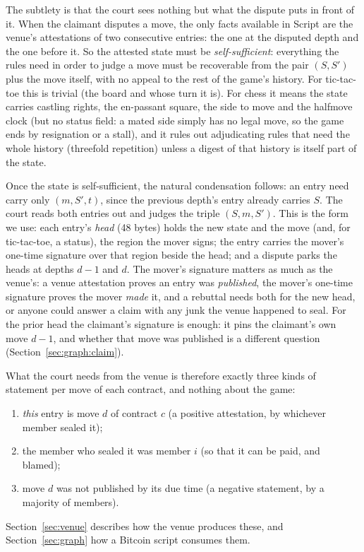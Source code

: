 \documentclass[11pt]{article}
\begin{document}
The subtlety is that the court sees nothing but what the dispute puts in
front of it. When the claimant disputes a move, the only facts available
in Script are the venue's attestations of two consecutive entries: the
one at the disputed depth and the one before it. So the attested state
must be \emph{self-sufficient}: everything the rules need in order to
judge a move must be recoverable from the pair $(S, S')$ plus the move
itself, with no appeal to the rest of the game's history. For
tic-tac-toe this is trivial (the board and whose turn it is). For chess
it means the state carries castling rights, the en-passant square, the
side to move and the halfmove clock (but no status field: a mated side
simply has no legal move, so the game ends by resignation or a stall),
and it rules out adjudicating rules
that need the whole history (threefold repetition) unless a digest of
that history is itself part of the state.

Once the state is self-sufficient, the natural condensation follows: an
entry need carry only $(m, S', t)$, since the previous depth's entry
already carries $S$. The court reads both entries out and judges the
triple $(S, m, S')$. This is the form we use: each entry's \emph{head}
(48 bytes) holds the new state and the move (and, for tic-tac-toe, a
status), the region the mover signs; the entry carries the mover's one-time signature over that
region beside the head; and a dispute parks the heads at depths $d-1$
and $d$. The mover's signature matters as much as the venue's: a venue
attestation proves an entry was \emph{published}, the mover's one-time
signature proves the mover \emph{made} it, and a rebuttal needs both
for the new head, or anyone could answer a claim with any junk the
venue happened to seal. For the prior head the claimant's signature is
enough: it pins the claimant's own move $d-1$, and whether that move
was published is a different question (Section~\ref{sec:graph:claim}).

What the court needs from the venue is therefore exactly three kinds of
statement per move of each contract, and nothing about the game:
\begin{enumerate}
\item \emph{this} entry is move $d$ of contract $c$ (a positive
  attestation, by whichever member sealed it);
\item the member who sealed it was member $i$ (so that it can be
  paid, and blamed);
\item move $d$ was not published by its due time (a negative statement,
  by a majority of members).
\end{enumerate}
Section~\ref{sec:venue} describes how the venue produces these, and
Section~\ref{sec:graph} how a Bitcoin script consumes them.
\end{document}

